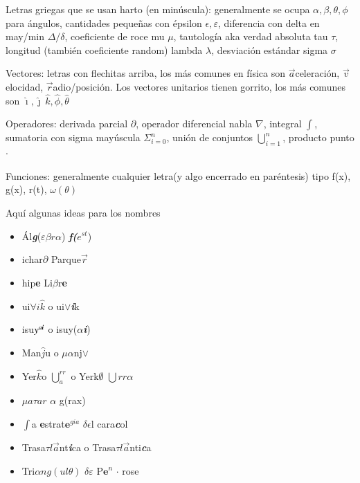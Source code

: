 Letras griegas que se usan harto (en minúscula): generalmente se ocupa \(\alpha, \beta, \theta, \phi\) para ángulos, cantidades pequeñas con épsilon \(\epsilon,  \varepsilon\), diferencia con delta en may/min \(\Delta / \delta\), coeficiente de roce mu \(\mu\), tautología aka verdad absoluta tau \(\tau\), longitud (también coeficiente random) lambda \(\lambda\), desviación estándar sigma \(\sigma\)

Vectores: letras con flechitas arriba, los más comunes en física son \(\vec{a}\)celeración, \(\vec{v}\)elocidad, \(\vec{r}\)adio/posición. Los vectores unitarios tienen gorrito, los más comunes son \(\hat{\imath}, \hat{\jmath}\, \hat{k}, \hat{\phi}, \hat{\theta}\)

Operadores: derivada parcial \(\partial\), operador diferencial nabla \(\nabla\), integral \(\int\), sumatoria con sigma mayúscula \(\Sigma^{n}_{i=0}\), unión de conjuntos \(\bigcup^{n}_{i=1}\), producto punto \(\cdot\)

Funciones: generalmente cualquier letra(y algo encerrado en paréntesis) tipo f(x), g(x), r(t), $\omega (\theta)$

Aquí algunas ideas para los nombres
\begin{itemize}
    \item {Ál\textit{\textbf{g}}(\(\varepsilon \beta r \alpha\)) \textbf{\textit{f(}\(e^{st}\)})}
    \item {\R ichar\(\partial\) Parque\(\vec{r}\)}
    \item {\C hip\textbf{e} Li\(\beta\)r\textbf{e}}
    \item {\Q ui\(\forall i \hat{k}\) o \Q ui\(\lor\)\textbf{\textit{i}}k}
    \item {\N isu\(y^{a\textit{\textbf{i}}}\) o \N isuy(\(\alpha\)\textit{\textbf{i}})}
    \item {Man\(\hat{j}\)u o \(\mu \alpha\)nj\(\lor\)}
    \item {Yer\(\hat{k}\)o \(\bigcup^{rr}_a\) o Yerk\(\emptyset\) \(\bigcup rr\alpha\)}
    \item {\(\mu a \tau ar\)  \(\alpha\) g(rax)}
    \item {\(\int\)a \textbf{e}strat\(\textbf{e}^{g\textit{i}a}\) \(\delta \epsilon\)l cara\textbf{\textit{c}}ol}
    \item {Trasa\(\tau l \vec{a}\)nt\textit{\textbf{i}}ca o Trasa\(\tau l\vec{a}\)nti\textit{\textbf{c}}a}
    \item {Tri\(\alpha ng(ul\theta)\) \(\delta \varepsilon\) P\(\textbf{e}^{n}\) \(\cdot\) rose}
\end{itemize}












\newpage